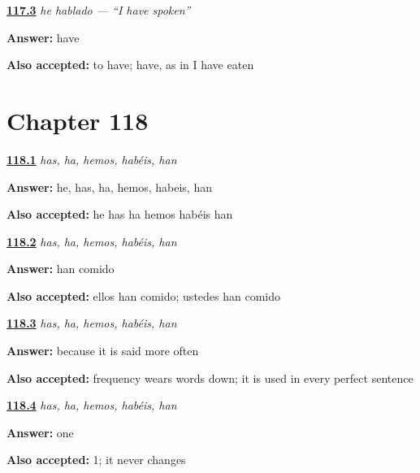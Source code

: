\noindent\begin{minipage}[t]{\linewidth}
\raggedright
\hyperlink{review-ES-C49-he-hablado-english}{\textbf{117.3}} \emph{he hablado — \textquotedblleft{}I have spoken\textquotedblright{}}\par
\small \textbf{Answer:} have\par
\footnotesize \textbf{Also accepted:} to have; have, as in I have eaten
\end{minipage}\par\medskip

\section*{Chapter 118}

\noindent\begin{minipage}[t]{\linewidth}
\raggedright
\hyperlink{review-ES-C49-haber-completo-all}{\textbf{118.1}} \emph{has, ha, hemos, habéis, han}\par
\small \textbf{Answer:} he, has, ha, hemos, habeis, han\par
\footnotesize \textbf{Also accepted:} he has ha hemos habéis han
\end{minipage}\par\medskip

\noindent\begin{minipage}[t]{\linewidth}
\raggedright
\hyperlink{review-ES-C49-haber-completo-they}{\textbf{118.2}} \emph{has, ha, hemos, habéis, han}\par
\small \textbf{Answer:} han comido\par
\footnotesize \textbf{Also accepted:} ellos han comido; ustedes han comido
\end{minipage}\par\medskip

\noindent\begin{minipage}[t]{\linewidth}
\raggedright
\hyperlink{review-ES-C49-haber-completo-why}{\textbf{118.3}} \emph{has, ha, hemos, habéis, han}\par
\small \textbf{Answer:} because it is said more often\par
\footnotesize \textbf{Also accepted:} frequency wears words down; it is used in every perfect sentence
\end{minipage}\par\medskip

\noindent\begin{minipage}[t]{\linewidth}
\raggedright
\hyperlink{review-ES-C49-haber-completo-participle}{\textbf{118.4}} \emph{has, ha, hemos, habéis, han}\par
\small \textbf{Answer:} one\par
\footnotesize \textbf{Also accepted:} 1; it never changes
\end{minipage}\par\medskip

